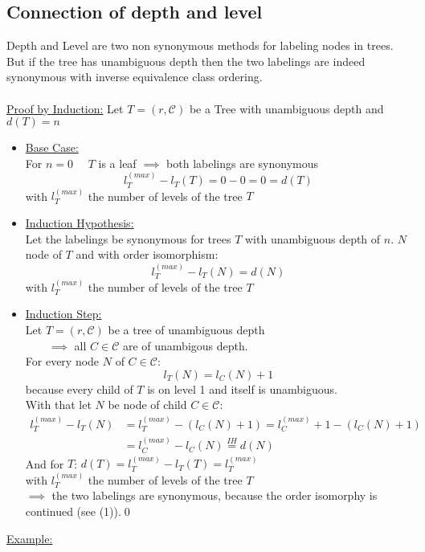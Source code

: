 \documentclass[a4paper,12pt]{article}
\theoremstyle{definition}
\begin{document}
	\subsection{Connection of depth and level}
	Depth and Level are two non synonymous methods for labeling nodes in trees.\\
	But if the tree has unambiguous depth then the two labelings are indeed synonymous with inverse equivalence class ordering.
	\\\\
	 \underline{Proof by Induction:} Let $T=(r,\mathcal{C})$ be a Tree with unambiguous depth and $d(T)=n$\\
	 \begin{itemize}
	 	\item \underline{Base Case:}\\
	 		For $n=0\quad$ $T$ is a leaf $\implies$ both labelings are synonymous
	 		\[l_T^{(max)}-l_T(T)=0-0=0=d(T)\]
	 		with $l_T^{(max)}$ the number of levels of the tree $T$
	 	\item \underline{Induction Hypothesis:}\\
	 		Let the labelings be synonymous for trees $T$ with unambiguous depth of $n$.
	 		$N$ node of $T$ and with order isomorphism:
	 		\[l_T^{(max)}-l_T(N)=d(N)\]
	 		with $l_T^{(max)}$ the number of levels of the tree $T$
	 	\item \underline{Induction Step:}\\
	 		Let $T=(r,\mathcal{C})$ be a tree of unambiguous depth\\
	 		$\qquad\implies $ all $C\in\mathcal{C}$ are of unambigous depth.\\
	 		For every node $N$ of $C\in\mathcal{C}:$\[ l_T(N)=l_C(N)+1\] because every child of $T$ is on level 1 and itself is unambiguous.\\
	 		With that let $N$ be node of child $C\in\mathcal{C}$:
	 		\begin{align}
	 			l_T^{(max)}-l_T(N)&=l_T^{(max)}-(l_C(N) + 1)=l_C^{(max)} + 1 -(l_C(N) + 1)\\
	 			&= l_C^{(max)}-l_C(N) \overset{IH}{=} d(N)
	 		\end{align}
 			And for $T$: $d(T)=l_T^{(max)} - l_T(T)=l_T^{(max)}$\\
	 		with $l_T^{(max)}$ the number of levels of the tree $T$\\
	 		$\implies$ the two labelings are synonymous, because the order isomorphy is continued  (see (1)).\qed
	 \end{itemize}
	 \underline{Example:}\\
\end{document}
